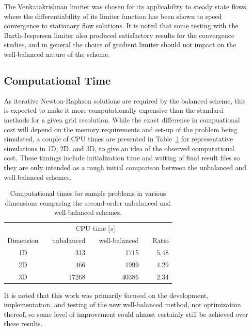The Venkatakrishnan limiter was chosen for its applicability to steady state flows, where the differentiability of its limiter function has been shown to speed convergence to stationary flow solutions. It is noted that some testing with the Barth-Jespersen limiter also produced satisfactory results for the convergence studies, and in general the choice of gradient limiter should not impact on the well-balanced nature of the scheme.

\subsection{Computational Time}
\label{subsec:timing}

As iterative Newton-Raphson solutions are required by the balanced scheme, this is expected to make it more computationally expensive than the standard methods for a given grid resolution. While the exact difference in compuational cost will depend on the memory requirements and set-up of the problem being simulated, a couple of CPU times are presented in Table~\ref{table:timing} for representative simulations in 1D, 2D, and 3D, to give an idea of the observed computational cost. These timings include initialization time and writing of final result files so they are only intended as a rough initial comparison between the unbalanced and well-balanced schemes.

\begin{table}\centering
\caption{Computational times for sample problems in various dimensions comparing the second-order unbalanced and well-balanced schemes.}
\label{table:timing}
\begin{tabular}{@{}crrrrrr@{}}\toprule
& \phantom{a} & \multicolumn{3}{c}{CPU time [$s$]} & \phantom{a} &\\
\cmidrule{3-5}
Dimension && unbalanced && well-balanced && Ratio\\ \midrule
1D && 313 && 1715 && 5.48\\
2D && 466 && 1999 && 4.29\\
3D && 17268 && 40386 && 2.34\\
\bottomrule
\end{tabular}
\end{table}

It is noted that this work was primarily focused on the development, implementation, and testing of the new well-balanced method, not optimization thereof, so some level of improvement could almost certainly still be achieved over these results.



